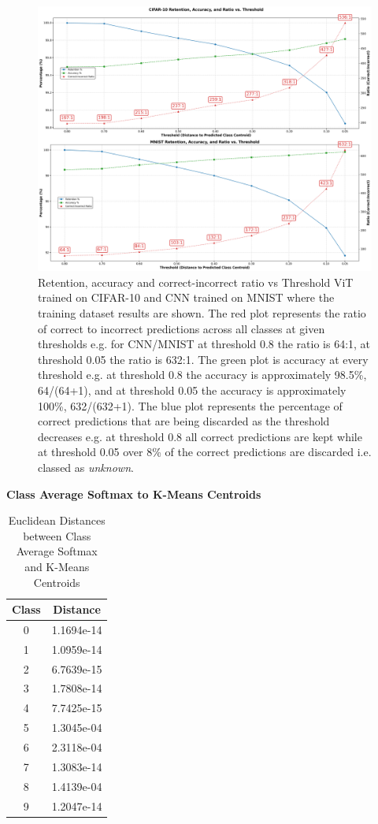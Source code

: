 \begin{figure}[ht!]
    \centering
    \includegraphics[width=0.99\columnwidth]{Figures/cifar10_mnist_retention_accuracy_ratio_vs_threshold.png}
    \caption{Retention, accuracy and correct-incorrect ratio vs Threshold ViT trained on CIFAR-10 and CNN trained on MNIST where the training dataset results are shown. The red plot represents the ratio of correct to incorrect predictions across all classes at given thresholds e.g. for CNN/MNIST at threshold 0.8 the ratio is 64:1, at threshold 0.05 the ratio is 632:1. The green plot is accuracy at every threshold e.g. at threshold 0.8 the accuracy is approximately 98.5\%, 64/(64+1), and at threshold 0.05 the accuracy is approximately 100\%, 632/(632+1). The blue plot represents the percentage of correct predictions that are being discarded as the threshold decreases e.g. at threshold 0.8 all correct predictions are kept while at threshold 0.05 over 8\% of the correct predictions are discarded i.e. classed as \textit{unknown}.}
\label{fig:MNIST_TRAINING_DATASET_ACC_RATIO_VS_THRESHOLD}
\end{figure}


\textbf{Class Average Softmax to K-Means Centroids}

\begin{table}[htbp]
\centering
\caption{Euclidean Distances between Class Average Softmax and K-Means Centroids}
\label{tab:diff_softmax_avg_dist_to_centroids}
\begin{tabular}{|c|c|}
\hline
Class & Distance \\
\hline
0 & 1.1694e-14 \\
\hline
1 & 1.0959e-14 \\
\hline
2 & 6.7639e-15 \\
\hline
3 & 1.7808e-14 \\
\hline
4 & 7.7425e-15 \\
\hline
5 & 1.3045e-04 \\
\hline
6 & 2.3118e-04 \\
\hline
7 & 1.3083e-14 \\
\hline
8 & 1.4139e-04 \\
\hline
9 & 1.2047e-14 \\
\hline
\end{tabular}
\end{table}

